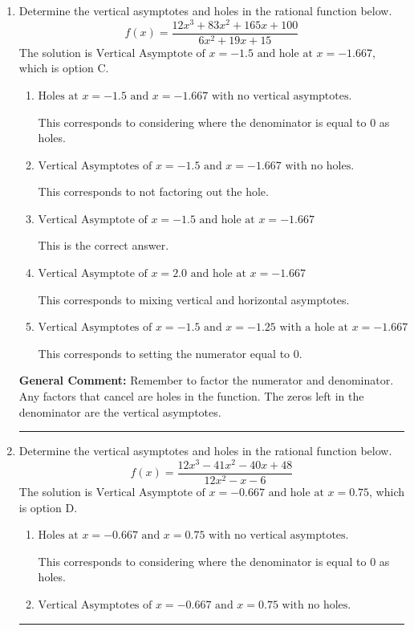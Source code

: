 \documentclass{extbook}[14pt]
\newcommand{\litem}[1]{\item #1

\rule{\textwidth}{0.4pt}}
\begin{document}
\begin{enumerate}\litem{
Determine the vertical asymptotes and holes in the rational function below.
\[ f(x) = \frac{12x^{3} +83 x^{2} +165 x + 100}{6x^{2} +19 x + 15} \]The solution is \( \text{Vertical Asymptote of } x = -1.5 \text{ and hole at } x = -1.667 \), which is option C.\begin{enumerate}[label=\Alph*.]
\item \( \text{Holes at } x = -1.5 \text{ and } x = -1.667 \text{ with no vertical asymptotes.} \)

This corresponds to considering where the denominator is equal to 0 as holes.
\item \( \text{Vertical Asymptotes of } x = -1.5 \text{ and } x = -1.667 \text{ with no holes.} \)

This corresponds to not factoring out the hole.
\item \( \text{Vertical Asymptote of } x = -1.5 \text{ and hole at } x = -1.667 \)

This is the correct answer.
\item \( \text{Vertical Asymptote of } x = 2.0 \text{ and hole at } x = -1.667 \)

This corresponds to mixing vertical and horizontal asymptotes.
\item \( \text{Vertical Asymptotes of } x = -1.5 \text{ and } x = -1.25 \text{ with a hole at } x = -1.667 \)

This corresponds to setting the numerator equal to 0.
\end{enumerate}

\textbf{General Comment:} Remember to factor the numerator and denominator. Any factors that cancel are holes in the function. The zeros left in the denominator are the vertical asymptotes.
}
\litem{
Determine the vertical asymptotes and holes in the rational function below.
\[ f(x) = \frac{12x^{3} -41 x^{2} -40 x + 48}{12x^{2} -x -6} \]The solution is \( \text{Vertical Asymptote of } x = -0.667 \text{ and hole at } x = 0.75 \), which is option D.\begin{enumerate}[label=\Alph*.]
\item \( \text{Holes at } x = -0.667 \text{ and } x = 0.75 \text{ with no vertical asymptotes.} \)

This corresponds to considering where the denominator is equal to 0 as holes.
\item \( \text{Vertical Asymptotes of } x = -0.667 \text{ and } x = 0.75 \text{ with no holes.} \)


\end{enumerate}}
\end{enumerate}
\end{document}
